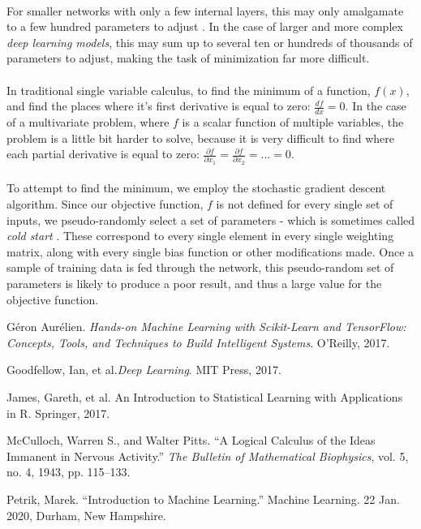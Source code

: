 \documentclass[12pt,letterpaper]{article}
\begin{document}
\paragraph*{}For smaller networks with only a few internal layers, this may only amalgamate to a few hundred parameters to adjust \cite{Goodfellow}. In the case of larger and more complex \textit{deep learning models}, this may sum up to several ten or hundreds of thousands of parameters to adjust, making the task of minimization far more difficult. 
\paragraph*{}In traditional single variable calculus, to find the minimum of a function, $f(x)$, and find the places where it's first derivative is equal to zero: $\frac{df}{dx} = 0$. In the case of a multivariate problem, where $f$ is a scalar function of multiple variables, the problem is a little bit harder to solve, because it is very difficult to find where each partial derivative is equal to zero: $\frac{\partial f}{\partial x_1} = \frac{\partial f}{\partial x_2} = ... = 0$.
\paragraph*{}To attempt to find the minimum, we employ the stochastic gradient descent algorithm. Since our objective function, $f$ is not defined for every single set of inputs, we pseudo-randomly select a set of parameters - which is sometimes called \textit{cold start} \cite{Goodfellow}. These correspond to every single element in every single weighting matrix, along with every single bias function or other modifications made. Once a sample of training data is fed through the network, this pseudo-random set of parameters is likely to produce a poor result, and thus a large value for the objective function.





\begin{thebibliography}{9}


Géron Aurélien. \textit{Hands-on Machine Learning with Scikit-Learn and TensorFlow: Concepts, Tools, and Techniques to Build Intelligent Systems}. O'Reilly, 2017.

Goodfellow, Ian, et al.\textit{Deep Learning}. MIT Press, 2017.

James, Gareth, et al. {An Introduction to Statistical Learning with Applications in R}. Springer, 2017.

McCulloch, Warren S., and Walter Pitts. “A Logical Calculus of the Ideas Immanent in Nervous Activity.” \textit{The Bulletin of Mathematical Biophysics}, vol. 5, no. 4, 1943, pp. 115–133.

Petrik, Marek. “Introduction to Machine Learning.” Machine Learning. 22 Jan. 2020, Durham, New Hampshire.

\end{thebibliography}

\end{document}

